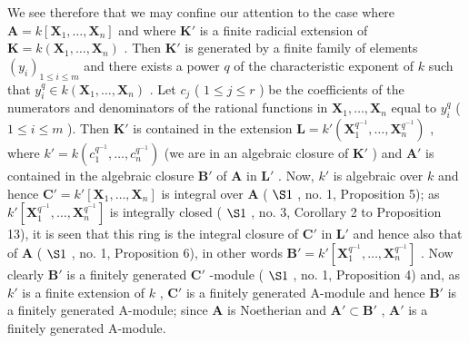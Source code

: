 We see therefore that we may confine our attention to the case where \(\mathbf{A} = k[\mathbf{X}_1, \ldots, \mathbf{X}_n]\) and where \(\mathbf{K}'\) is a finite radicial extension of \(\mathbf{K} = k(\mathbf{X}_1, \ldots, \mathbf{X}_n)\) . Then \(\mathbf{K}'\) is generated by a finite family of elements \((y_i)_{1 \leqslant i \leqslant m}\) and there exists a power \(q\) of the characteristic exponent of \(k\) such that \(y_i^q \in k(\mathbf{X}_1, \ldots, \mathbf{X}_n)\) . Let \(c_j\) ( \(1 \leqslant j \leqslant r\) ) be the coefficients of the numerators and denominators of the rational functions in \(\mathbf{X}_1, \ldots, \mathbf{X}_n\) equal to \(y_i^q\) ( \(1 \leqslant i \leqslant m\) ). Then \(\mathbf{K}'\) is contained in the extension \(\mathbf{L} = k'(\mathbf{X}_1^{q^{-1}}, \ldots, \mathbf{X}_n^{q^{-1}})\) , where \(k' = k(c_1^{q^{-1}}, \ldots, c_n^{q^{-1}})\) (we are in an algebraic closure of \(\mathbf{K}'\) ) and \(\mathbf{A}'\) is contained in the algebraic closure \(\mathbf{B}'\) of \(\mathbf{A}\) in \(\mathbf{L}'\) . Now, \(k'\) is algebraic over \(k\) and hence \(\mathbf{C}' = k'[\mathbf{X}_1, \ldots, \mathbf{X}_n]\) is integral over \(\mathbf{A}\) ( \(\S 1\) , no. 1, Proposition 5); as \(k'[\mathbf{X}_1^{q^{-1}}, \ldots, \mathbf{X}_n^{q^{-1}}]\) is integrally closed ( \(\S 1\) , no. 3, Corollary 2 to Proposition 13), it is seen that this ring is the integral closure of \(\mathbf{C}'\) in \(\mathbf{L}'\) and hence also that of \(\mathbf{A}\) ( \(\S 1\) , no. 1, Proposition 6), in other words \(\mathbf{B}' = k'[\mathbf{X}_1^{q^{-1}}, \ldots, \mathbf{X}_n^{q^{-1}}]\) . Now clearly \(\mathbf{B}'\) is a finitely generated \(\mathbf{C}'\) -module ( \(\S 1\) , no. 1, Proposition 4) and, as \(k'\) is a finite extension of \(k\) , \(\mathbf{C}'\) is a finitely generated A-module and hence \(\mathbf{B}'\) is a finitely generated A-module; since \(\mathbf{A}\) is Noetherian and \(\mathbf{A}' \subset \mathbf{B}'\) , \(\mathbf{A}'\) is a finitely generated A-module.

